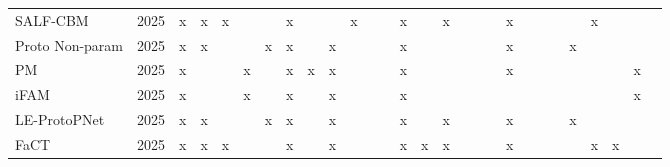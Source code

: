 \begin{tabular}{ll|cc|ccc|cc|cccc|ccccc|ccccc|ccccc}
SALF-CBM \cite{benouShowTellVisually2025} & 2025 & x & x & x &  &  & x &  &  & x &  &  & x &  & x &  &  &  & x &  &  &  &  & x &  &  &  \\
Proto Non-param \cite{zhuInterpretableImageClassification2025} & 2025 & x & x &  &  & x & x &  & x &  &  &  & x &  &  &  &  &  & x &  &  &  & x &  &  &  &  \\
PM \cite{kangImprovingViTInterpretability2025} & 2025 & x &  &  & x &  & x & x & x &  &  &  & x &  &  &  &  &  & x &  &  &  &  &  &  & x &  \\
iFAM \cite{anirajInherentlyFaithfulAttention2025} & 2025 & x &  &  & x &  & x &  & x &  &  &  & x &  &  &  &  &  &  &  &  &  &  &  &  & x &  \\
LE-ProtoPNet \cite{jiInterpretableFewShotImage2025} & 2025 & x & x &  &  & x & x &  & x &  &  &  & x &  & x &  &  &  & x &  &  &  & x &  &  &  &  \\
FaCT \cite{parchami-araghiFaCTFaithfulConcept2025} & 2025 & x & x & x &  &  & x &  & x &  &  &  & x & x & x &  &  &  & x &  &  &  &  & x & x &  &  \\
\bottomrule
\end{tabular}
